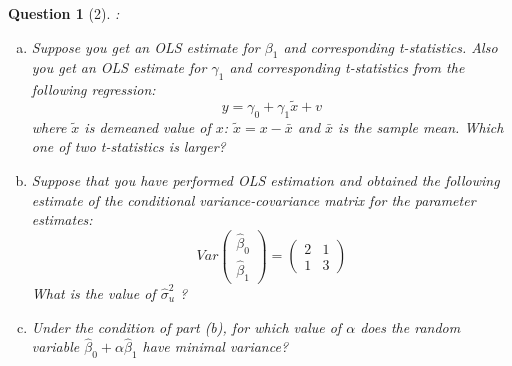 \documentclass[12pt,reqno]{amsart}
\theoremstyle{plain}
\newtheorem*{theorem*}{Question}
\begin{document}
\begin{theorem*}[2]
    \normalfont
    :
    \begin{enumerate}[(a)]
        \item Suppose you get an OLS estimate for $ \beta_{1} $ and corresponding t-statistics.
              Also you get an OLS estimate for $ \gamma_{1} $ and corresponding t-statistics from the following
              regression:
              \[y = \gamma_0 + \gamma_1 \tilde{x} + v \]
              where $ \tilde{x} $ is demeaned value of $ x $: $ \tilde{x} = x - \bar{x} $ and $ \bar{x} $ is the sample mean.
              Which one of two t-statistics is larger?
        \item  Suppose that you have performed OLS estimation and obtained the following estimate of
              the conditional variance-covariance matrix for the parameter estimates:
              \[
                  Var\begin{pmatrix*}
                      \hat\beta_{0} \\ \hat\beta_{1}
                  \end{pmatrix*} = \begin{pmatrix*}
                      2 & 1 \\ 1 & 3
                  \end{pmatrix*}
              \]
              What is the value of $ \hat\sigma^{2}_{u} $ ?
        \item Under the condition of part (b), for which value of $ \alpha $ does the random variable
              $ \hat\beta_{0} + \alpha\hat\beta_{1} $
              have minimal variance?
    \end{enumerate}
\end{theorem*}
\end{document}
